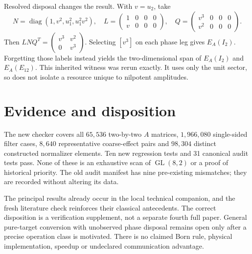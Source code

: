 \documentclass[11pt]{article}
\DeclareMathOperator{\GL}{GL}
\DeclareMathOperator{\diag}{diag}
\begin{document}
Resolved disposal changes the result. With $v=u_2$, take
\[
 N=\diag(1,v^2,u_1^2,u_1^2v^2),\quad
 L=\begin{pmatrix}1&0&0&0\\v&0&0&0\end{pmatrix},\quad
 Q=\begin{pmatrix}v^3&0&0&0\\v^2&0&0&0\end{pmatrix}.
\]
Then $LNQ^T=\left(\begin{smallmatrix}v^3&v^2\\0&v^3\end{smallmatrix}\right)$.
Selecting $[v^3]$ on each phase leg gives $E_A(I_2)$. Forgetting those labels
instead yields the two-dimensional span of $E_A(I_2)$ and $E_A(E_{12})$.
This inherited witness was rerun exactly. It uses only the unit sector, so
does not isolate a resource unique to nilpotent amplitudes.

\section{Evidence and disposition}
The new checker covers all $65,536$ two-by-two $A$ matrices, $1,966,080$
single-sided filter cases, $8,640$ representative coarse-effect pairs and
$98,304$ distinct constructed normalizer elements. Ten new regression tests
and 31 canonical audit tests pass. None of these is an exhaustive scan of
$\GL(8,2)$ or a proof of historical priority. The old audit manifest has nine
pre-existing mismatches; they are recorded without altering its data.

The principal results already occur in the local technical companion, and the
fresh literature check reinforces their classical antecedents. The correct
disposition is a verification supplement, not a separate fourth full paper.
General pure-target conversion with unobserved phase disposal remains open
only after a precise operation class is motivated. There is no claimed Born
rule, physical implementation, speedup or undeclared communication advantage.


\end{document}
